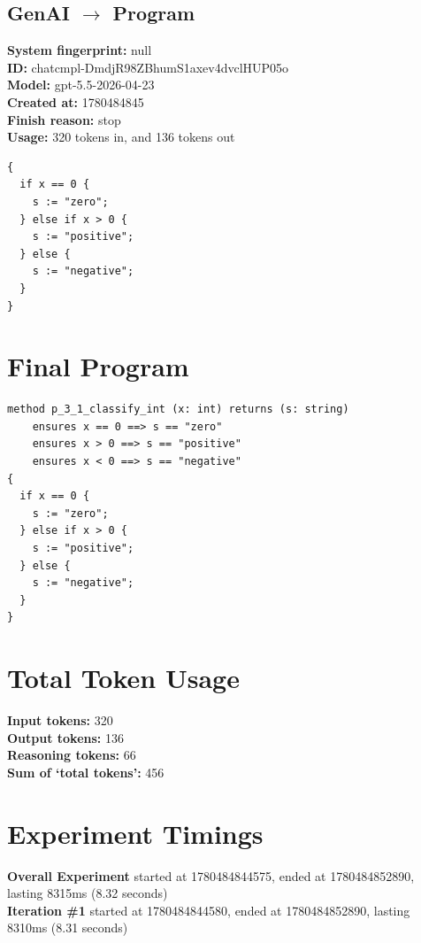 \documentclass{article}
\begin{document}
\subsection*{GenAI $\rightarrow$ Program}
\textbf{System fingerprint: }null
\\\textbf{ID: }chatcmpl-DmdjR98ZBhumS1axev4dvclHUP05o
\\\textbf{Model: }gpt-5.5-2026-04-23
\\\textbf{Created at: }1780484845
\\\textbf{Finish reason: }stop
\\\textbf{Usage: }320 tokens in, and 136 tokens out
\begin{lstlisting}
{
  if x == 0 {
    s := "zero";
  } else if x > 0 {
    s := "positive";
  } else {
    s := "negative";
  }
}
\end{lstlisting}
\section*{Final Program}
\begin{lstlisting}
method p_3_1_classify_int (x: int) returns (s: string)
	ensures x == 0 ==> s == "zero"
	ensures x > 0 ==> s == "positive"
	ensures x < 0 ==> s == "negative"
{
  if x == 0 {
    s := "zero";
  } else if x > 0 {
    s := "positive";
  } else {
    s := "negative";
  }
}
\end{lstlisting}
\section*{Total Token Usage}
\textbf{Input tokens: }320
\\\textbf{Output tokens: }136
\\\textbf{Reasoning tokens: }66
\\\textbf{Sum of `total tokens': }456
\section*{Experiment Timings}
\textbf{Overall Experiment} started at 1780484844575, ended at 1780484852890, lasting 8315ms (8.32 seconds)
\\\textbf{Iteration \#1} started at 1780484844580, ended at 1780484852890, lasting 8310ms (8.31 seconds)
\end{document}
